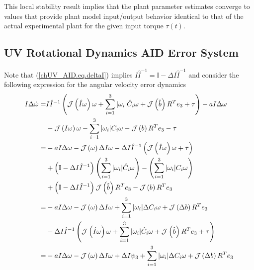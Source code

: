 \noindent This local stability result implies that the plant parameter
estimates converge to values that provide plant model input/output
behavior identical to that of the actual experimental plant for the
given input torque $\tau(t)$.
%
%
%


\subsection{\ac{UV} Rotational Dynamics \ac{AID} Error System}
\label{chUV_AID.sec.UVSO3_AID_errSys}

Note that (\ref{chUV_AID.eq.deltaI}) implies $I\hat{I}^{-1} =
\mathbb{I} - \Delta I \hat{I}^{-1}$ and consider the following expression for
the angular velocity error dynamics
%
\begin{align}
I\Delta \dot{\omega}=
   &I\hat{I}^{-1}\left(\mathcal{J}\left( \hat{I}\omega \right)\omega+
    \sum_{i=1}^3 |\omega_i|\hat{C}_i\omega+\mathcal{J}\left( \hat{b} \right)R^T e_3+
   \tau \right) - aI\Delta \omega
\nonumber \\
   &-\mathcal{J}\left( I\omega \right)\omega
    -\sum_{i=1}^3 |\omega_i|C_i\omega-\mathcal{J}\left( b \right)R^T e_3
    - \tau
\nonumber \\
  =&-a I \Delta\omega -\mathcal{J}\left( \omega \right)\Delta I\omega -\Delta I \hat{I}^{-1}
     \left(\mathcal{J}\left( \hat{I}\omega \right)\omega+\tau\right)  
\nonumber \\
   &+\left(\mathbb{I} - \Delta I\hat{I}^{-1}\right)\left(\sum_{i=1}^3 |\omega_i|\hat{C}_i\omega\right)
    -\left(\sum_{i=1}^3 |\omega_i|C_i\omega\right)
\nonumber \\
   &+\left(\mathbb{I} - \Delta I\hat{I}^{-1}\right)\mathcal{J}\left( \hat{b} \right)R^T e_3
    -\mathcal{J}\left( b \right)R^T e_3
\nonumber \\
  =&-a I \Delta\omega -\mathcal{J}\left( \omega \right)\Delta I\omega 
    +\sum_{i=1}^3 |\omega_i|\Delta C_i\omega
    +\mathcal{J}\left( \Delta b \right)R^T e_3
\nonumber \\
   &-\Delta I \hat{I}^{-1}\left(\mathcal{J}\left( \hat{I}\omega \right)\omega+
    \sum_{i=1}^3 |\omega_i|\hat{C}_i\omega+
    \mathcal{J}\left( \hat{b} \right)R^T e_3+\tau\right)
\nonumber \\
  =&-a I \Delta\omega -\mathcal{J}\left( \omega \right)\Delta I\omega
    +\Delta I \psi_3 
    +\sum_{i=1}^3 |\omega_i|\Delta C_i\omega
    +\mathcal{J}\left( \Delta b \right)R^T e_3
\label{chUV_AID.eq.UV_SO3_Ideltawdot}
\end{align}
%

